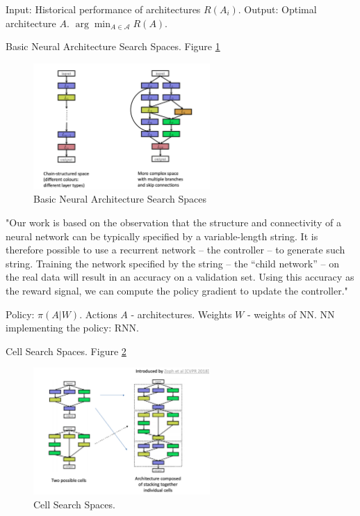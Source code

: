 \documentclass[english]{article}
\begin{document}
Input: Historical performance of architectures $R(A_i)$. Output: Optimal architecture $A$.  $\arg\min_{A\in\mathcal{A}} R(A)$.





\item Basic Neural Architecture Search Spaces. Figure \ref{nas2}  
\begin{figure}[h!]
  \centering
  \includegraphics[width=0.6\textwidth]{nas2.png}
  \caption{Basic Neural Architecture Search Spaces}
  \label{nas2}
\end{figure}

"Our work is based on the observation that the structure and connectivity of a neural network can be typically specified by a variable-length string. It is therefore possible to use
a recurrent network – the controller – to generate such string. Training the network specified by the
string – the “child network” – on the real data will result in an accuracy on a validation set. Using
this accuracy as the reward signal, we can compute the policy gradient to update the controller."


Policy: $\pi(A|W)$. Actions $A$ - architectures. Weights $W$ - weights of NN. NN implementing the policy: RNN.


\item Cell Search Spaces. Figure \ref{nas3}  


\begin{figure}[h!]
  \centering
  \includegraphics[width=0.6\textwidth]{nas3.png}
  \caption{Cell Search Spaces.}
  \label{nas3}
\end{figure}
\end{document}
